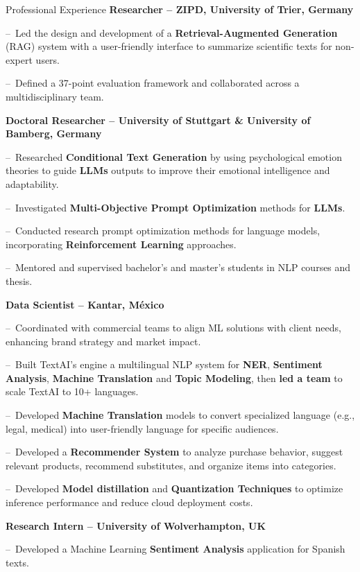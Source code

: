 \begin{rubric}{Professional Experience}
    \entry*[02.2025 -- Present] \textbf{Researcher -- ZIPD, University of Trier, Germany}

    	--~Led the design and development of a \textbf{Retrieval-Augmented Generation} (RAG) system with a user-friendly interface to summarize scientific texts for non-expert users.\par

    	--~Defined a 37-point evaluation framework and collaborated across a multidisciplinary team.\par\par

    \entry*[04.2022 -- 01.2025] \textbf{Doctoral Researcher -- University of Stuttgart \& University of Bamberg, Germany}

    	--~Researched \textbf{Conditional Text Generation} by using psychological emotion theories to guide \textbf{LLMs} outputs to improve their emotional intelligence and adaptability.\par

    	--~Investigated \textbf{Multi-Objective Prompt Optimization} methods for \textbf{LLMs}.\par

    	--~Conducted research prompt optimization methods for language models, incorporating \textbf{Reinforcement Learning} approaches.\par

    	--~Mentored and supervised bachelor’s and master’s students in NLP courses and thesis.\par

    \entry*[06.2018 -- 09.2021] \textbf{Data Scientist -- Kantar, México}

    	--~Coordinated with commercial teams to align ML solutions with client needs, enhancing brand strategy and market impact.\par
%
    	--~Built TextAI’s engine a multilingual NLP system for \textbf{NER}, \textbf{Sentiment Analysis}, \textbf{Machine Translation} and \textbf{Topic Modeling}, then \textbf{led a team} to scale TextAI to 10+ languages.\par

    	--~Developed \textbf{Machine Translation} models to convert specialized language (e.g., legal, medical) into user-friendly language for specific audiences.

    	--~Developed a \textbf{Recommender System} to analyze purchase behavior, suggest relevant products, recommend substitutes, and organize items into categories.\par

    	--~Developed \textbf{Model distillation} and \textbf{Quantization Techniques} to optimize inference performance and reduce cloud deployment costs.

%
%
    \entry*[02.2017 -- 08.2017] \textbf{Research Intern -- University of Wolverhampton, UK}

    --~Developed a Machine Learning \textbf{Sentiment Analysis} application for Spanish texts.
%
\end{rubric}